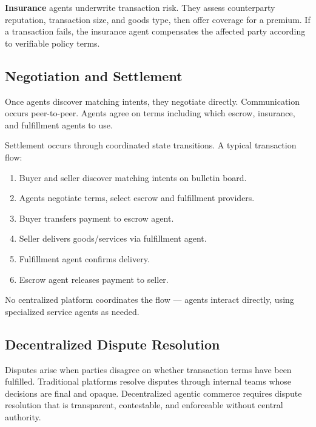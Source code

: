 \documentclass{article}
\begin{document}
\textbf{Insurance} agents underwrite transaction risk. They assess counterparty reputation, transaction size, and goods type, then offer coverage for a premium. If a transaction fails, the insurance agent compensates the affected party according to verifiable policy terms.

\subsection{Negotiation and Settlement}

Once agents discover matching intents, they negotiate directly. Communication occurs peer-to-peer. Agents agree on terms including which escrow, insurance, and fulfillment agents to use.

Settlement occurs through coordinated state transitions. A typical transaction flow:

\begin{enumerate}
    \item Buyer and seller discover matching intents on bulletin board.

    \item Agents negotiate terms, select escrow and fulfillment providers.

    \item Buyer transfers payment to escrow agent.

    \item Seller delivers goods/services via fulfillment agent.

    \item Fulfillment agent confirms delivery.

    \item Escrow agent releases payment to seller.
\end{enumerate}

No centralized platform coordinates the flow  --- agents interact directly, using specialized service agents as needed.

\subsection{Decentralized Dispute Resolution}

Disputes arise when parties disagree on whether transaction terms have been fulfilled. Traditional platforms resolve disputes through internal teams whose decisions are final and opaque. Decentralized agentic commerce requires dispute resolution that is transparent, contestable, and enforceable without central authority.
\end{document}
